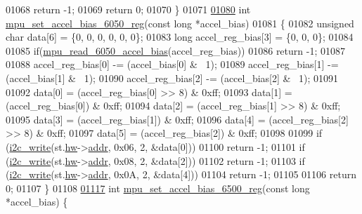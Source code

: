 \begin{DoxyCode}
{{{{01068         \textcolor{keywordflow}{return} -1;
01069     \textcolor{keywordflow}{return} 0;
01070 \}
01071 
\hypertarget{inv__mpu_8c_source.tex_l01080}{}\hyperlink{group___d_r_i_v_e_r_s_gae2eb5073dacc7455101bf6818e35c40a}{01080} \textcolor{keywordtype}{int} \hyperlink{group___d_r_i_v_e_r_s_gae2eb5073dacc7455101bf6818e35c40a}{mpu\_set\_accel\_bias\_6050\_reg}(\textcolor{keyword}{const} \textcolor{keywordtype}{long} *accel\_bias)
01081 \{
01082     \textcolor{keywordtype}{unsigned} \textcolor{keywordtype}{char} data[6] = \{0, 0, 0, 0, 0, 0\};
01083     \textcolor{keywordtype}{long} accel\_reg\_bias[3] = \{0, 0, 0\};
01084 
01085     \textcolor{keywordflow}{if}(\hyperlink{group___d_r_i_v_e_r_s_gaed37421e1f140d10ee0eff0efeade27b}{mpu\_read\_6050\_accel\_bias}(accel\_reg\_bias))
01086         \textcolor{keywordflow}{return} -1;
01087 
01088     accel\_reg\_bias[0] -= (accel\_bias[0] & ~1);
01089     accel\_reg\_bias[1] -= (accel\_bias[1] & ~1);
01090     accel\_reg\_bias[2] -= (accel\_bias[2] & ~1);
01091 
01092     data[0] = (accel\_reg\_bias[0] >> 8) & 0xff;
01093     data[1] = (accel\_reg\_bias[0]) & 0xff;
01094     data[2] = (accel\_reg\_bias[1] >> 8) & 0xff;
01095     data[3] = (accel\_reg\_bias[1]) & 0xff;
01096     data[4] = (accel\_reg\_bias[2] >> 8) & 0xff;
01097     data[5] = (accel\_reg\_bias[2]) & 0xff;
01098 
01099     \textcolor{keywordflow}{if} (\hyperlink{_i2_c_8c_ac0f145afe8d662af199043939f4398d6}{i2c\_write}(st.\hyperlink{structgyro__state__s_a5bac30a96752691e4cc723735060e360}{hw}->\hyperlink{structhw__s_a4c34a946600e9d68b6355d23f54d291b}{addr}, 0x06, 2, &data[0]))
01100         \textcolor{keywordflow}{return} -1;
01101     \textcolor{keywordflow}{if} (\hyperlink{_i2_c_8c_ac0f145afe8d662af199043939f4398d6}{i2c\_write}(st.\hyperlink{structgyro__state__s_a5bac30a96752691e4cc723735060e360}{hw}->\hyperlink{structhw__s_a4c34a946600e9d68b6355d23f54d291b}{addr}, 0x08, 2, &data[2]))
01102         \textcolor{keywordflow}{return} -1;
01103     \textcolor{keywordflow}{if} (\hyperlink{_i2_c_8c_ac0f145afe8d662af199043939f4398d6}{i2c\_write}(st.\hyperlink{structgyro__state__s_a5bac30a96752691e4cc723735060e360}{hw}->\hyperlink{structhw__s_a4c34a946600e9d68b6355d23f54d291b}{addr}, 0x0A, 2, &data[4]))
01104         \textcolor{keywordflow}{return} -1;
01105 
01106     \textcolor{keywordflow}{return} 0;
01107 \}
01108 
\hypertarget{inv__mpu_8c_source.tex_l01117}{}\hyperlink{group___d_r_i_v_e_r_s_gaa7265afee29b8307ff49a8b1ccd9238a}{01117} \textcolor{keywordtype}{int} \hyperlink{group___d_r_i_v_e_r_s_gaa7265afee29b8307ff49a8b1ccd9238a}{mpu\_set\_accel\_bias\_6500\_reg}(\textcolor{keyword}{const} \textcolor{keywordtype}{long} *accel\_bias) \{
}}}}
\end{DoxyCode}
